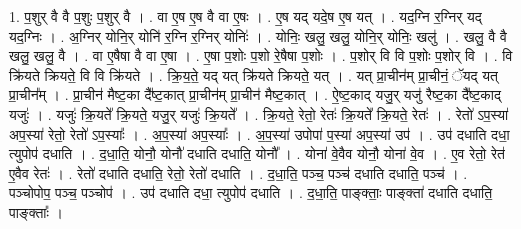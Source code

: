 \documentclass[17pt]{extarticle}
\begin{document}
1. प॒शुर् वै वै प॒शुः प॒शुर् वै । . वा ए॒ष ए॒ष वै वा ए॒षः । . ए॒ष यद् यदे॒ष ए॒ष यत् । . यद॒ग्नि र॒ग्निर् यद् यद॒ग्निः । . अ॒ग्निर् योनि॒र् योनि॑ र॒ग्नि र॒ग्निर् योनिः॑ । . योनिः॒ खलु॒ खलु॒ योनि॒र् योनिः॒ खलु॑ । . खलु॒ वै वै खलु॒ खलु॒ वै । . वा ए॒षैषा वै वा ए॒षा । . ए॒षा प॒शोः प॒शो रे॒षैषा प॒शोः । . प॒शोर् वि वि प॒शोः प॒शोर् वि । . वि क्रि॑यते क्रियते॒ वि वि क्रि॑यते । . क्रि॒य॒ते॒ यद् यत् क्रि॑यते क्रियते॒ यत् । . यत् प्रा॒चीन॑म् प्रा॒चीनं॒ ॅयद् यत् प्रा॒चीन᳚म् । . प्रा॒चीन॑ मैष्ट॒का दै᳚ष्ट॒कात् प्रा॒चीन॑म् प्रा॒चीन॑ मैष्ट॒कात् । . ऐ॒ष्ट॒काद् यजु॒र् यजु॑ रैष्ट॒का दै᳚ष्ट॒काद् यजुः॑ । . यजुः॑ क्रि॒यते᳚ क्रि॒यते॒ यजु॒र् यजुः॑ क्रि॒यते᳚ । . क्रि॒यते॒ रेतो॒ रेतः॑ क्रि॒यते᳚ क्रि॒यते॒ रेतः॑ । . रेतो॑ ऽप॒स्या॑ अप॒स्या॑ रेतो॒ रेतो॑ ऽप॒स्याः᳚ । . अ॒प॒स्या॑ अप॒स्याः᳚ । . अ॒प॒स्या॑ उपोपा॑ प॒स्या॑ अप॒स्या॑ उप॑ । . उप॑ दधाति दधा॒ त्युपोप॑ दधाति । . द॒धा॒ति॒ योनौ॒ योनौ॑ दधाति दधाति॒ योनौ᳚ । . योना॑ वे॒वैव योनौ॒ योना॑ वे॒व । . ए॒व रेतो॒ रेत॑ ए॒वैव रेतः॑ । . रेतो॑ दधाति दधाति॒ रेतो॒ रेतो॑ दधाति । . द॒धा॒ति॒ पञ्च॒ पञ्च॑ दधाति दधाति॒ पञ्च॑ । . पञ्चोपोप॒ पञ्च॒ पञ्चोप॑ । . उप॑ दधाति दधा॒ त्युपोप॑ दधाति । . द॒धा॒ति॒ पाङ्क्ताः॒ पाङ्क्ता॑ दधाति दधाति॒ पाङ्क्ताः᳚ । \newline
\end{document}
